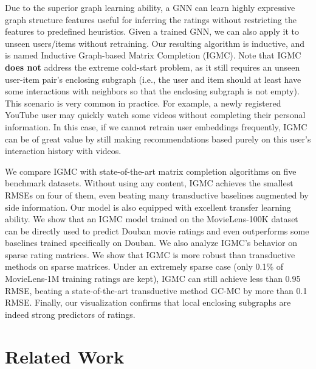 \documentclass{article} \usepackage{iclr2020_conference,times}
\begin{document}
Due to the superior graph learning ability, a GNN can learn highly expressive graph structure features useful for inferring the ratings without restricting the features to predefined heuristics. Given a trained GNN, we can also apply it to unseen users/items without retraining. Our resulting algorithm is inductive, and is named Inductive Graph-based Matrix Completion (IGMC). Note that IGMC \textbf{does not} address the extreme cold-start problem, as it still requires an unseen user-item pair's enclosing subgraph (i.e., the user and item should at least have some interactions with neighbors so that the enclosing subgraph is not empty). This scenario is very common in practice. For example, a newly registered YouTube user may quickly watch some videos without completing their personal information. In this case, if we cannot retrain user embeddings frequently, IGMC can be of great value by still making recommendations based purely on this user's interaction history with videos.

We compare IGMC with state-of-the-art matrix completion algorithms on five benchmark datasets. Without using any content, IGMC achieves the smallest RMSEs on four of them, even beating many transductive baselines augmented by side information. 
Our model is also equipped with excellent transfer learning ability. We show that an IGMC model trained on the MovieLens-100K dataset can be directly used to predict Douban movie ratings and even outperforms some baselines trained specifically on Douban. We also analyze IGMC's behavior on sparse rating matrices. We show that IGMC is more robust than transductive methods on sparse matrices. Under an extremely sparse case (only 0.1\% of MovieLens-1M training ratings are kept), IGMC can still achieve less than 0.95 RMSE, beating a state-of-the-art transductive method GC-MC by more than 0.1 RMSE. Finally, our visualization confirms that local enclosing subgraphs are indeed strong predictors of ratings.










\section{Related Work}\label{appendix:related}
\end{document}
